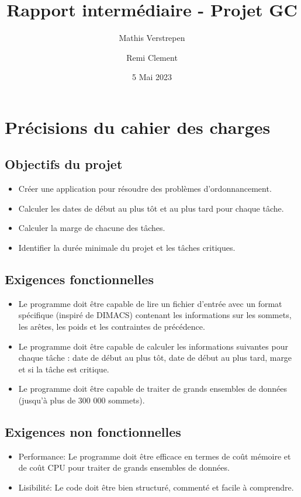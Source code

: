 \documentclass{article}
\title{Rapport intermédiaire - Projet GC}
\date{5 Mai 2023}
\author{Mathis Verstrepen \and Remi Clement}
\begin{document}
\maketitle
\section{Précisions du cahier des charges}

\subsection{Objectifs du projet}

\begin{itemize}
\item Créer une application pour résoudre des problèmes d'ordonnancement.
\item Calculer les dates de début au plus tôt et au plus tard pour chaque tâche.
\item Calculer la marge de chacune des tâches.
\item Identifier la durée minimale du projet et les tâches critiques.
\end{itemize}

\subsection{Exigences fonctionnelles}

\begin{itemize}
\item Le programme doit être capable de lire un fichier d'entrée avec un format spécifique (inspiré de DIMACS) contenant les informations sur les sommets, les arêtes, les poids et les contraintes de précédence.
\item Le programme doit être capable de calculer les informations suivantes pour chaque tâche : date de début au plus tôt, date de début au plus tard, marge et si la tâche est critique.
\item Le programme doit être capable de traiter de grands ensembles de données (jusqu'à plus de 300 000 sommets).
\end{itemize}

\subsection{Exigences non fonctionnelles}

\begin{itemize}
\item Performance: Le programme doit être efficace en termes de coût mémoire et de coût CPU pour traiter de grands ensembles de données.
\item Lisibilité: Le code doit être bien structuré, commenté et facile à comprendre.
\end{itemize}
\end{document}

